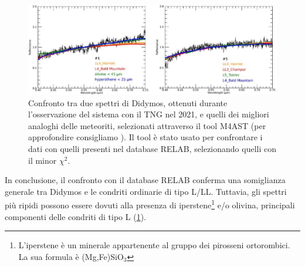 \documentclass[a4paper,11pt,openright]{book}
\begin{document}
\begin{figure}[!h]
    \centering
    \includegraphics[scale=0.96]{figure/Ieva et al.jpg}
    \caption[Confronto tra spettri di Didymos e analoghi delle meteoriti.]{Confronto tra due spettri di Didymos, ottenuti durante l'osservazione del sistema con il TNG nel 2021, e quelli dei migliori analoghi delle meteoriti, selezionati attraverso il tool M4AST (per approfondire consigliamo \cite{popescu_modelling_2012}). Il tool è stato usato per confrontare i dati con quelli presenti nel database RELAB, selezionando quelli con il minor $\chi^2$. \citep{ieva_spectral_2022}}
    \label{fig:ieva_spectra}
\end{figure}

In conclusione, il confronto con il database RELAB conferma una somiglianza generale tra Didymos e le condriti ordinarie di tipo L/LL. Tuttavia, gli spettri più ripidi possono essere dovuti alla presenza di iperstene\footnote{L'iperstene è un minerale appartenente al gruppo dei pirosseni ortorombici. La sua formula è (Mg,Fe)SiO$_3$} e/o olivina, principali componenti delle condriti di tipo L (\cref{fig:ieva_spectra}).
\end{document}
